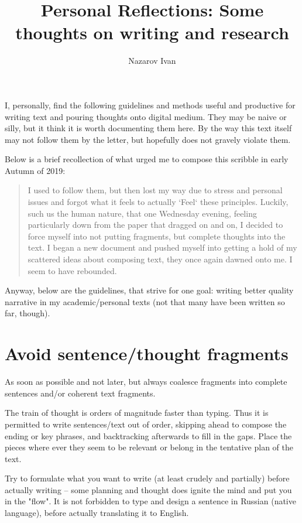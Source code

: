 \documentclass[10pt,a4paper,twocolumn]{article}
\title{Personal Reflections: Some thoughts on writing and research}
\author{Nazarov Ivan}
\begin{document}
\maketitle

I, personally, find the following guidelines and methods useful and productive for
writing text and pouring thoughts onto digital medium. They may be naive or silly, but
it think it is worth documenting them here. By the way this text itself may not follow
them by the letter, but hopefully does not gravely violate them.

Below is a brief recollection of what urged me to compose this scribble in early
Autumn of 2019:
\begin{quote}
  I used to follow them, but then lost my way due to stress and personal issues and
  forgot what it feels to actually `Feel` these principles. Luckily, such us the human
  nature, that one Wednesday evening, feeling particularly down from the paper that
  dragged on and on, I decided to force myself into not putting fragments, but complete
  thoughts into the text. I began a new document and pushed myself into getting a hold
  of my scattered ideas about composing text, they once again dawned onto me. I seem
  to have rebounded.
\end{quote}

Anyway, below are the guidelines, that strive for one goal: writing better quality
narrative in my academic/personal texts (not that many have been written so far, though).

\section{Avoid sentence/thought fragments} %
\label{sec:avoid_sentence_thought_fragments}

As soon as possible and not later, but always coalesce fragments into complete sentences
and/or coherent text fragments.

The train of thought is orders of magnitude faster than typing. Thus it is permitted
to write sentences/text out of order, skipping ahead to compose the ending or key phrases,
and backtracking afterwards to fill in the gaps. Place the pieces where ever they seem
to be relevant or belong in the tentative plan of the text.

Try to formulate what you want to write (at least crudely and partially) before actually
writing -- some planning and thought does ignite the mind and put you in the "flow".
It is not forbidden to type and design a sentence in Russian (native language), before
actually translating it to English.
\end{document}
